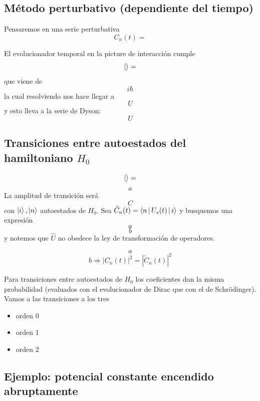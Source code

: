 \documentclass[10pt,oneside]{CBFT_book}
\begin{document}
\subsection{Método perturbativo (dependiente del tiempo)}

Pensaremos en una serie perturbativa 
\[
	C_n(t) =
\]

El evolucionador temporal en la picture de interacción cumple 
\[
	\Ket{} =
\]
que viene de  
\[
	i\hbar
\]
la cual resolviendo nos hace llegar a 
\[
	U
\]
y esto lleva a la serie de Dyson:
\[
	U
\]

\subsection{Transiciones entre autoestados del hamiltoniano $H_0$}
\[
	\Ket{} =
\]
\[
	a
\]
La amplitud de transición será 
\[
	C
\]
con $\Ket{i},\Ket{n}$ autoestados de $H_0$.
Sea $\tilde{C}_n(t)=\Braket{n|U_s(t)|i}$ y busquemos una expresión 
\[
	a
\]
\[
	b
\]
y notemos que $\hat{U}$ no obedece la ley de transformación de operadores.

\[
	a
\]
\[
	b \Rightarrow |C_n(t)|^2 = |\tilde{C}_n(t)|^2
\]

Para transiciones entre autoestados de $H_0$ los coeficientes dan la misma probabilidad (evaluados con el 
evolucionador de Dirac que con el de Schrödinger).
Vamos a las transiciones a los tres 
\begin{itemize}
 \item orden 0
 \item orden 1
 \item orden 2
\end{itemize}

\subsection{Ejemplo: potencial constante encendido abruptamente}









\end{document}
